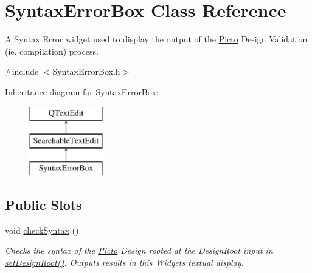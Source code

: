 \hypertarget{class_syntax_error_box}{\section{Syntax\-Error\-Box Class Reference}
\label{class_syntax_error_box}
}


A Syntax Error widget used to display the output of the \hyperlink{namespace_picto}{Picto} Design Validation (ie. compilation) process.  




{\ttfamily \#include $<$Syntax\-Error\-Box.\-h$>$}

Inheritance diagram for Syntax\-Error\-Box\-:\begin{figure}[H]
\begin{center}
\leavevmode
\includegraphics[height=3.000000cm]{class_syntax_error_box}
\end{center}
\end{figure}
\subsection*{Public Slots}
\begin{DoxyCompactItemize}
\item 
void \hyperlink{class_syntax_error_box_ae92a8085d48e2a73d44dec2d870e3a71}{check\-Syntax} ()
\begin{DoxyCompactList}\small\item\em Checks the syntax of the \hyperlink{namespace_picto}{Picto} Design rooted at the Design\-Root input in \hyperlink{class_syntax_error_box_ae28581de605e6916f103c7ded7cba7cc}{set\-Design\-Root()}. Outputs results in this Widgets textual display. \end{DoxyCompactList}\end{DoxyCompactItemize}

